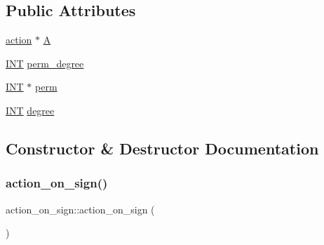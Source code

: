 \subsection*{Public Attributes}
\begin{DoxyCompactItemize}
\item 
\mbox{\hyperlink{classaction}{action}} $\ast$ \mbox{\hyperlink{classaction__on__sign_a281ba8bac580733b5e6515a5603cd2c8}{A}}
\item 
\mbox{\hyperlink{galois_8h_a09fddde158a3a20bd2dcadb609de11dc}{I\+NT}} \mbox{\hyperlink{classaction__on__sign_aa818aeade989a7ce598fa261772289e1}{perm\+\_\+degree}}
\item 
\mbox{\hyperlink{galois_8h_a09fddde158a3a20bd2dcadb609de11dc}{I\+NT}} $\ast$ \mbox{\hyperlink{classaction__on__sign_a7001e26142ce265ecb70ecaa8f2c07c6}{perm}}
\item 
\mbox{\hyperlink{galois_8h_a09fddde158a3a20bd2dcadb609de11dc}{I\+NT}} \mbox{\hyperlink{classaction__on__sign_a06961404155067bdb486b323a323855e}{degree}}
\end{DoxyCompactItemize}


\subsection{Constructor \& Destructor Documentation}
\mbox{\label{classaction__on__sign_a846a035f98356d2ac35b8d9b85534433}} 
\subsubsection{\texorpdfstring{action\+\_\+on\+\_\+sign()}{action\_on\_sign()}}
{\footnotesize\ttfamily action\+\_\+on\+\_\+sign\+::action\+\_\+on\+\_\+sign (\begin{DoxyParamCaption}{ }\end{DoxyParamCaption})}

\mbox{\label{classaction__on__sign_a64412ea8878684dc7d116d7f43a41041}} 

